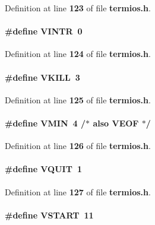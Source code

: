 Definition at line {\bf 123} of file {\bf termios.\+h}.

\paragraph[{V\+I\+N\+TR}]{\setlength{\rightskip}{0pt plus 5cm}\#define V\+I\+N\+TR~0}\label{termios_8h_a5760397a3b875a073800edd2052d3816}


Definition at line {\bf 124} of file {\bf termios.\+h}.

\paragraph[{V\+K\+I\+LL}]{\setlength{\rightskip}{0pt plus 5cm}\#define V\+K\+I\+LL~3}\label{termios_8h_a88b8378648f28423304b9f589276279d}


Definition at line {\bf 125} of file {\bf termios.\+h}.

\paragraph[{V\+M\+IN}]{\setlength{\rightskip}{0pt plus 5cm}\#define V\+M\+IN~4 /$\ast$ also {\bf V\+E\+OF} $\ast$/}\label{termios_8h_a52eb058f379b5122d28b036a06ce0e76}


Definition at line {\bf 126} of file {\bf termios.\+h}.

\paragraph[{V\+Q\+U\+IT}]{\setlength{\rightskip}{0pt plus 5cm}\#define V\+Q\+U\+IT~1}\label{termios_8h_a31cfa1f14eadee06c346549d734ed586}


Definition at line {\bf 127} of file {\bf termios.\+h}.

\paragraph[{V\+S\+T\+A\+RT}]{\setlength{\rightskip}{0pt plus 5cm}\#define V\+S\+T\+A\+RT~11}\label{termios_8h_afdce6a08e849190113d017282db3d425}


